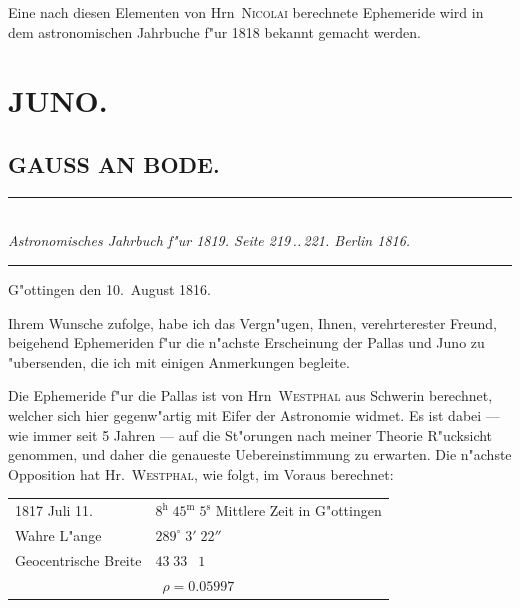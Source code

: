 \documentclass[12pt,a4paper]{article}
\begin{document}
Eine nach diesen Elementen von Hrn~\textsc{Nicolai} berechnete Ephemeride wird in dem astronomischen
Jahrbuche f"ur 1818 bekannt gemacht werden.

\newpage

\section*{JUNO.}

\subsection*{GAUSS AN BODE.}

\begin{center}
\rule{0.6\textwidth}{0.4pt}\\[0.5em]
\textit{Astronomisches Jahrbuch f"ur 1819. Seite 219\,..\,221. Berlin 1816.}\\[0.3em]
\rule{0.6\textwidth}{0.4pt}
\end{center}

\begin{flushright}
G"ottingen den 10.~August 1816.
\end{flushright}

Ihrem Wunsche zufolge, habe ich das Vergn"ugen, Ihnen, verehrterester Freund, beigehend Ephemeriden
f"ur die n"achste Erscheinung der Pallas und Juno zu "ubersenden, die ich mit einigen Anmerkungen begleite.

Die Ephemeride f"ur die Pallas ist von Hrn~\textsc{Westphal} aus Schwerin berechnet, welcher sich hier
gegenw"artig mit Eifer der Astronomie widmet. Es ist dabei --- wie immer seit 5 Jahren --- auf die
St"orungen nach meiner Theorie R"ucksicht genommen, und daher die genaueste Uebereinstimmung zu erwarten.
Die n"achste Opposition hat Hr.~\textsc{Westphal}, wie folgt, im Voraus berechnet:

\begin{center}
\begin{tabular}{l@{\quad}l}
1817 Juli 11. & $8^{\mathrm{h}}\;45^{\mathrm{m}}\;5^{\mathrm{s}}$ Mittlere Zeit in G"ottingen \\
Wahre L"ange \dotfill & $289^{\circ}\;3'\;22''$ \\
Geocentrische Breite \dotfill & $43\;33\;\phantom{0}1$ \\
\multicolumn{2}{c}{$\rho = 0.05997$}
\end{tabular}
\end{center}
\end{document}
